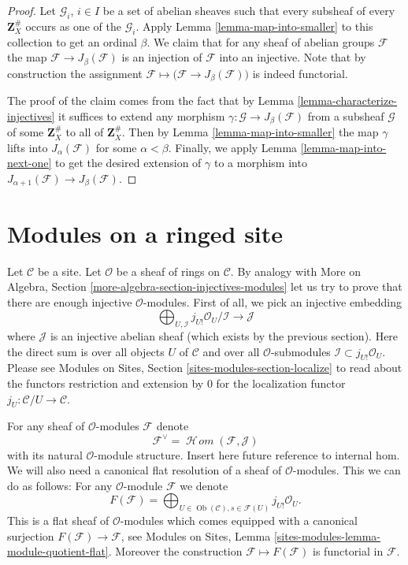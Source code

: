 \documentclass{stacks-project}
\theoremstyle{plain}
\theoremstyle{definition}
\theoremstyle{remark}
\numberwithin{equation}{subsection}
\def\SheafHom{\mathop{\mathcal{H}\!\mathit{om}}\nolimits}
\def\Ob{\mathop{\mathrm{Ob}}\nolimits}
\begin{document}
\begin{proof}
Let $\mathcal{G}_i$, $i \in I$ be a set of abelian
sheaves such that every subsheaf of every $\mathbf{Z}_X^\#$
occurs as one of the $\mathcal{G}_i$. Apply
Lemma \ref{lemma-map-into-smaller} to this collection to
get an ordinal $\beta$. We claim that for any sheaf of abelian
groups $\mathcal{F}$ the map $\mathcal{F} \to J_\beta(\mathcal{F})$
is an injection of $\mathcal{F}$ into an injective.
Note that by construction the assignment
$\mathcal{F} \mapsto \big(\mathcal{F} \to J_\beta(\mathcal{F})\big)$
is indeed functorial.

\medskip\noindent
The proof of the claim comes from the fact that by
Lemma \ref{lemma-characterize-injectives} it suffices to extend any
morphism $\gamma : \mathcal{G} \to J_\beta(\mathcal{F})$
from a subsheaf $\mathcal{G}$ of some $\mathbf{Z}_X^\#$ to all of
$\mathbf{Z}_X^\#$. Then by Lemma \ref{lemma-map-into-smaller} the
map $\gamma$ lifts into $J_\alpha(\mathcal{F})$ for some
$\alpha < \beta$. Finally, we apply Lemma \ref{lemma-map-into-next-one}
to get the desired extension of $\gamma$ to a morphism
into $J_{\alpha + 1}(\mathcal{F}) \to J_\beta(\mathcal{F})$.
\end{proof}






\section{Modules on a ringed site}
\label{section-sheaves-modules}

\noindent
Let $\mathcal{C}$ be a site.
Let $\mathcal{O}$ be a sheaf of rings on $\mathcal{C}$.
By analogy with
More on Algebra, Section \ref{more-algebra-section-injectives-modules}
let us try to prove that there are enough injective
$\mathcal{O}$-modules. First of all, we pick an injective
embedding
$$
\bigoplus\nolimits_{U, \mathcal{I}}
j_{U!}\mathcal{O}_U/\mathcal{I}
\longrightarrow
\mathcal{J}
$$
where $\mathcal{J}$ is an injective abelian sheaf (which
exists by the previous section). Here the direct sum is
over all objects $U$ of $\mathcal{C}$ and over all
$\mathcal{O}$-submodules $\mathcal{I} \subset j_{U!}\mathcal{O}_U$.
Please see
Modules on Sites, Section \ref{sites-modules-section-localize}
to read about the functors restriction and
extension by $0$ for the localization functor
$j_U : \mathcal{C}/U \to \mathcal{C}$.

\medskip\noindent
For any sheaf of $\mathcal{O}$-modules $\mathcal{F}$ denote
$$
\mathcal{F}^\vee
=
\SheafHom(\mathcal{F}, \mathcal{J})
$$
with its natural $\mathcal{O}$-module structure.
Insert here future reference to internal hom.
We will also need
a canonical flat resolution of a sheaf of $\mathcal{O}$-modules.
This we can do as follows: For any $\mathcal{O}$-module
$\mathcal{F}$ we denote
$$
F(\mathcal{F})
=
\bigoplus\nolimits_{U \in \Ob(\mathcal{C}), s \in \mathcal{F}(U)}
j_{U!}\mathcal{O}_U.
$$
This is a flat sheaf of $\mathcal{O}$-modules which comes equipped
with a canonical surjection $F(\mathcal{F}) \to \mathcal{F}$, see
Modules on Sites, Lemma \ref{sites-modules-lemma-module-quotient-flat}.
Moreover the construction $\mathcal{F} \mapsto F(\mathcal{F})$
is functorial in $\mathcal{F}$.
\end{document}
